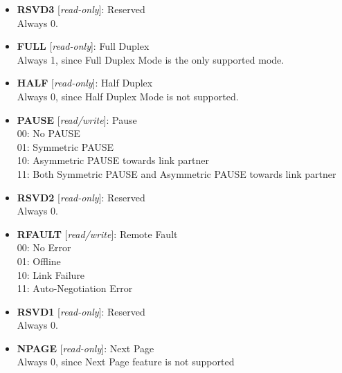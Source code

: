 \begin{itemize}
\item \begin{small}
{\bf 
RSVD3
} [\emph{read-only}]: Reserved
\\
Always 0.
\end{small}
\item \begin{small}
{\bf 
FULL
} [\emph{read-only}]: Full Duplex
\\
Always 1, since Full Duplex Mode is the only supported mode.
\end{small}
\item \begin{small}
{\bf 
HALF
} [\emph{read-only}]: Half Duplex
\\
Always 0, since Half Duplex Mode is not supported.
\end{small}
\item \begin{small}
{\bf 
PAUSE
} [\emph{read/write}]: Pause
\\
00: No PAUSE\\				                01: Symmetric PAUSE \\				                10: Asymmetric PAUSE towards link partner\\				                11: Both Symmetric PAUSE and Asymmetric PAUSE towards link partner
\end{small}
\item \begin{small}
{\bf 
RSVD2
} [\emph{read-only}]: Reserved
\\
Always 0.
\end{small}
\item \begin{small}
{\bf 
RFAULT
} [\emph{read/write}]: Remote Fault
\\
00: No Error \\				                01: Offline \\				                10: Link Failure \\				                11: Auto-Negotiation Error
\end{small}
\item \begin{small}
{\bf 
RSVD1
} [\emph{read-only}]: Reserved
\\
Always 0.
\end{small}
\item \begin{small}
{\bf 
NPAGE
} [\emph{read-only}]: Next Page
\\
Always 0, since Next Page feature is not supported
\end{small}
\end{itemize}
